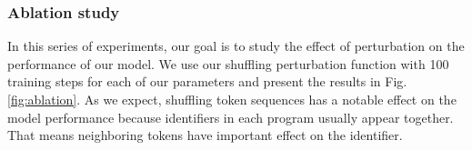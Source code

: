 \documentclass[acmsmall]{acmart}
\begin{document}
\subsubsection{Ablation study}
In this series of experiments, our goal is to study the effect of perturbation on the performance of our model. We use our shuffling perturbation function with 100 training steps for each of our parameters and present the results in Fig. \ref{fig:ablation}. As we expect, shuffling token sequences has a notable effect on the model performance because identifiers in each program usually appear together. That means neighboring tokens have important effect on the identifier.

\begin{figure}%
	\hspace*{\fill}
	\hspace*{\fill}


\end{figure}
\end{document}
